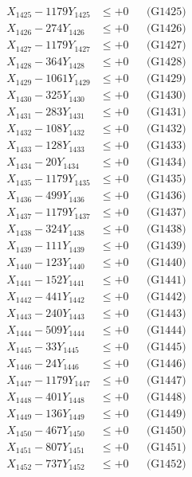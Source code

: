 \documentclass[a4paper,10pt]{article}
\begin{document}
{\begin{align}
X_{1425} - 1179Y_{1425} &\leq +0 && \text{(G1425)} \\
X_{1426} - 274Y_{1426} &\leq +0 && \text{(G1426)} \\
X_{1427} - 1179Y_{1427} &\leq +0 && \text{(G1427)} \\
X_{1428} - 364Y_{1428} &\leq +0 && \text{(G1428)} \\
X_{1429} - 1061Y_{1429} &\leq +0 && \text{(G1429)} \\
X_{1430} - 325Y_{1430} &\leq +0 && \text{(G1430)} \\
\allowbreak
X_{1431} - 283Y_{1431} &\leq +0 && \text{(G1431)} \\
X_{1432} - 108Y_{1432} &\leq +0 && \text{(G1432)} \\
X_{1433} - 128Y_{1433} &\leq +0 && \text{(G1433)} \\
X_{1434} - 20Y_{1434} &\leq +0 && \text{(G1434)} \\
X_{1435} - 1179Y_{1435} &\leq +0 && \text{(G1435)} \\
X_{1436} - 499Y_{1436} &\leq +0 && \text{(G1436)} \\
X_{1437} - 1179Y_{1437} &\leq +0 && \text{(G1437)} \\
X_{1438} - 324Y_{1438} &\leq +0 && \text{(G1438)} \\
X_{1439} - 111Y_{1439} &\leq +0 && \text{(G1439)} \\
X_{1440} - 123Y_{1440} &\leq +0 && \text{(G1440)} \\
\allowbreak
X_{1441} - 152Y_{1441} &\leq +0 && \text{(G1441)} \\
X_{1442} - 441Y_{1442} &\leq +0 && \text{(G1442)} \\
X_{1443} - 240Y_{1443} &\leq +0 && \text{(G1443)} \\
X_{1444} - 509Y_{1444} &\leq +0 && \text{(G1444)} \\
X_{1445} - 33Y_{1445} &\leq +0 && \text{(G1445)} \\
X_{1446} - 24Y_{1446} &\leq +0 && \text{(G1446)} \\
X_{1447} - 1179Y_{1447} &\leq +0 && \text{(G1447)} \\
X_{1448} - 401Y_{1448} &\leq +0 && \text{(G1448)} \\
X_{1449} - 136Y_{1449} &\leq +0 && \text{(G1449)} \\
X_{1450} - 467Y_{1450} &\leq +0 && \text{(G1450)} \\
\allowbreak
X_{1451} - 807Y_{1451} &\leq +0 && \text{(G1451)} \\
X_{1452} - 737Y_{1452} &\leq +0 && \text{(G1452)} \\

\end{align}}
\end{document}
